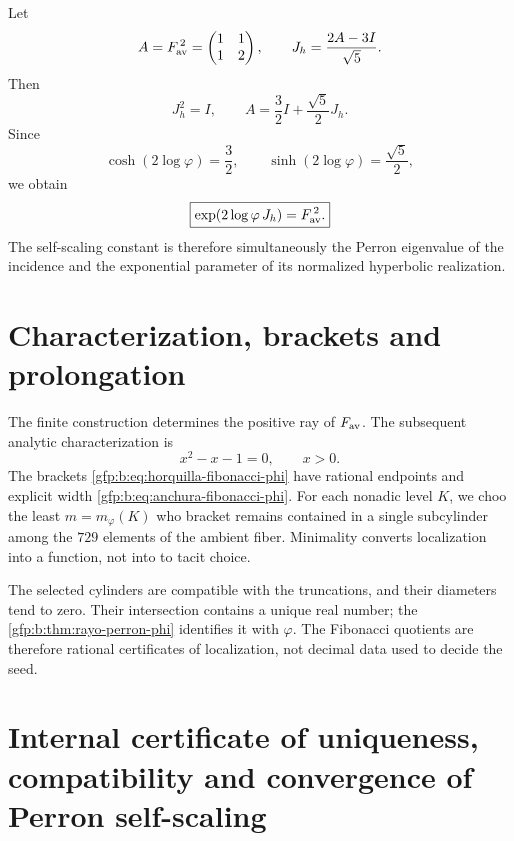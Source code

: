 Let
\[
 A=F_{\rm av}^{\,2}=
 \begin{pmatrix}1&1\\1&2\end{pmatrix},
 \qquad
 J_h=\frac{2A-3I}{\sqrt5}.
\]
Then
\[
 J_h^2=I,
 \qquad
 A=\frac32I+\frac{\sqrt5}{2}J_h.
\]
Since
\[
 \cosh(2\log\varphi)=\frac32,
 \qquad
 \sinh(2\log\varphi)=\frac{\sqrt5}{2},
\]
we obtain
\begin{equation}
 \boxed{
 \exp(2\log\varphi\,J_h)=F_{\rm av}^{\,2}.}
 \label{gfp:b:eq:realizacion-hiperbolica-phi}
\end{equation}
The self-scaling constant is therefore simultaneously the Perron
eigenvalue of the incidence and the exponential parameter of its normalized
hyperbolic realization.

\section{Characterization, brackets and prolongation}

The finite construction determines the positive ray of \(F_{\rm av}\). The
subsequent analytic characterization is
\[
 x^2-x-1=0,
 \qquad x>0.
\]
The brackets \eqref{gfp:b:eq:horquilla-fibonacci-phi} have rational endpoints
and explicit width \eqref{gfp:b:eq:anchura-fibonacci-phi}. For each
nonadic level \(K\), we choo the least \(m=m_{\varphi}(K)\) who bracket remains
contained in a single subcylinder among the \(729\) elements of the
ambient fiber. Minimality converts localization into a function, not into to
tacit choice.

The selected cylinders are compatible with the truncations, and their
diameters tend to zero. Their intersection contains a unique real number; the
\cref{gfp:b:thm:rayo-perron-phi} identifies it with \(\varphi\). The Fibonacci
quotients are therefore rational certificates of localization, not decimal data
used to decide the seed.

\section{Internal certificate of uniqueness, compatibility and convergence of Perron self-scaling}

